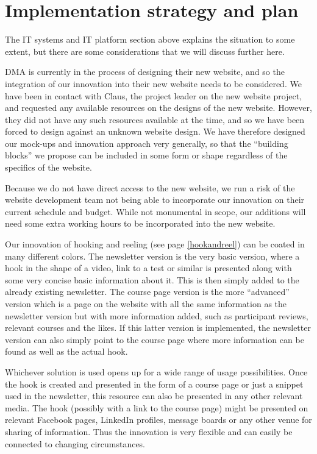 \section{Implementation strategy and plan}
\label{sec:implementation}
The IT systems and IT platform section above explains the situation to some extent, but there are some considerations that we will discuss further here.

DMA is currently in the process of designing their new website, and so the integration of our innovation into their new website needs to be considered. We have been in contact with Claus, the project leader on the new website project, and requested any available resources on the designs of the new website. However, they did not have any such resources available at the time, and so we have been forced to design against an unknown website design. We have therefore designed our mock-ups and innovation approach very generally, so that the “building blocks” we propose can be included in some form or shape regardless of the specifics of the website.

Because we do not have direct access to the new website, we run a risk of the website development team not being able to incorporate our innovation on their current schedule and budget. While not monumental in scope, our additions will need some extra working hours to be incorporated into the new website.

Our innovation of hooking and reeling (see page \ref{hookandreel}) can be coated in many different colors. The newsletter version is the very basic version, where a hook in the shape of a video, link to a test or similar is presented along with some very concise basic information about it. This is then simply added to the already existing newsletter. The course page version is the more “advanced” version which is a page on the website with all the same information as the newsletter version but with more information added, such as participant reviews, relevant courses and the likes. If this latter version is implemented, the newsletter version can also simply point to the course page where more information can be found as well as the actual hook.

Whichever solution is used opens up for a wide range of usage possibilities. Once the hook is created and presented in the form of a course page or just a snippet used in the newsletter, this resource can also be presented in any other relevant media. The hook (possibly with a link to the course page) might be presented on relevant Facebook pages, LinkedIn profiles, message boards or any other venue for sharing of information. Thus the innovation is very flexible and can easily be connected to changing circumstances.

